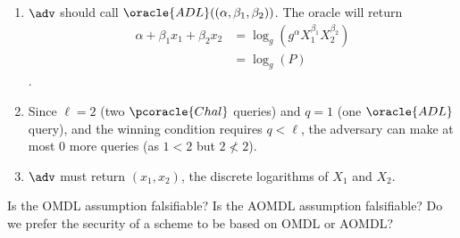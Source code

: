 \ifsolutions
\begin{mysolution}
  \begin{enumerate}
  \item $\adv$ should call $\oracle{ADL}((\alpha, \beta_1, \beta_2))$. The oracle will return
    \begin{align*}
      \alpha + \beta_1 x_1 + \beta_2 x_2 &= \log_g(g^\alpha X_1^{\beta_1} X_2^{\beta_2})\\
      &= \log_g(P)
    \end{align*}.
    \item Since $\ell = 2$ (two $\pcoracle{Chal}$ queries) and $q = 1$ (one $\oracle{ADL}$ query), and the winning condition requires $q < \ell$, the adversary can make at most 0 more queries (as $1 < 2$ but $2 \not< 2$).
    \item $\adv$ must return $(x_1, x_2)$, the discrete logarithms of $X_1$ and $X_2$.
  \end{enumerate}
\end{mysolution}
\fi

\begin{exercise}
  Is the OMDL assumption falsifiable? Is the AOMDL assumption falsifiable? Do we prefer the security of a scheme to be based on OMDL or AOMDL?
\end{exercise}

